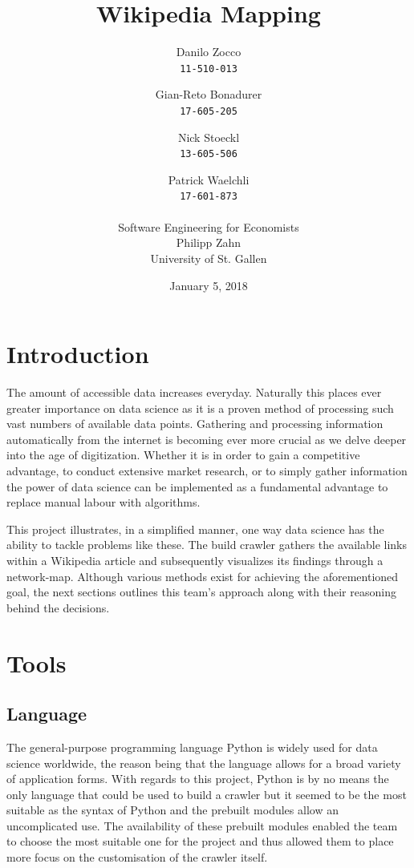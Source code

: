 \documentclass[10pt]{article}
\title{Wikipedia Mapping}
\author{Danilo Zocco\\ \texttt{11-510-013}
	\and Gian-Reto Bonadurer\\ \texttt{17-605-205}
	\and Nick Stoeckl\\ \texttt{13-605-506}
	\and Patrick Waelchli\\ \texttt{17-601-873}\\ \\
	\large Software Engineering for Economists\\
	\large Philipp Zahn\\
	\large University of St. Gallen}
\date{January 5, 2018}
\begin{document}
\maketitle
\newpage

\tableofcontents
\vspace{3cm}
\listoffigures
\newpage


\section{Introduction}

The amount of accessible data increases everyday. Naturally this places ever greater importance on data science as it is a proven method of processing such vast numbers of available data points. \cite{dat} Gathering and processing information automatically from 
the internet is becoming ever more crucial as we delve deeper into the age of digitization. Whether it is in order to gain a competitive advantage, to conduct extensive market research, or to simply gather information the power of data science can be implemented as a fundamental advantage to replace manual labour with algorithms. \par
 \noindent This project illustrates, in a simplified manner, one way data science has the ability to tackle problems like these. The build crawler gathers the available links within a Wikipedia article and subsequently visualizes its findings through a network-map. Although various methods exist for achieving the aforementioned goal, the next sections outlines this team's approach along with their reasoning behind the decisions.

\section{Tools}	
	\subsection{Language}

The general-purpose programming language Python is widely used for data science worldwide, the reason being that the language allows for a broad variety of application forms. \cite{pyt} With regards to this project, Python is by no means the only language that could be used to build a crawler but it seemed to be the most suitable as the syntax of Python and the prebuilt modules allow an uncomplicated use. The availability of these prebuilt modules enabled the team to choose the most suitable one for the project and thus allowed them to place more focus on the customisation of the crawler itself. \par 
 
\end{document}
